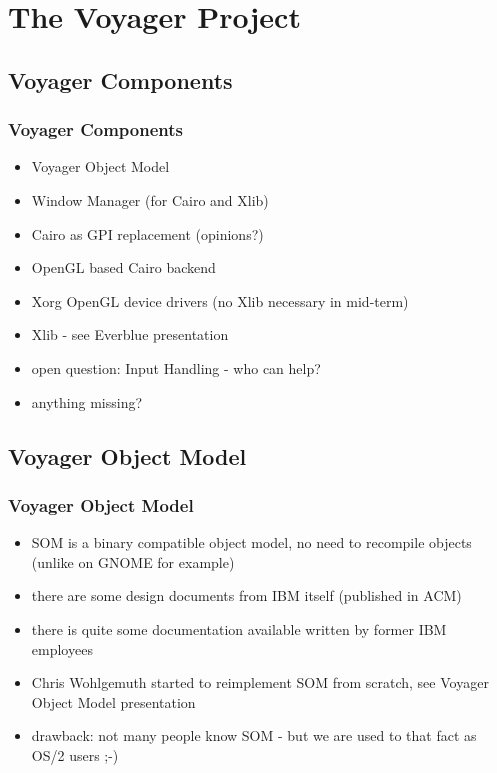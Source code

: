 \documentclass[handout]{beamer}
\begin{document}
\section{The Voyager Project}
\subsection{Voyager Components}
\begin{frame}
\frametitle{Voyager Components}
	\begin{itemize}
		\item Voyager Object Model
		\item Window Manager (for Cairo and Xlib)
		\item Cairo as GPI replacement (opinions?)
		\item OpenGL based Cairo backend
		\item Xorg OpenGL device drivers (no Xlib necessary in mid-term)
		\item Xlib - see Everblue presentation
		\item open question: Input Handling - who can help?
		\item anything missing? 
	\end{itemize}
\end{frame}

\subsection{Voyager Object Model}
\begin{frame}
\frametitle{Voyager Object Model}
	\begin{itemize}
		\item SOM is a binary compatible object model, no need to recompile objects (unlike on GNOME for example)
		\item there are some design documents from IBM itself (published in ACM)
		\item there is quite some documentation available written by former IBM employees
		\item Chris Wohlgemuth started to reimplement SOM from scratch, see Voyager Object Model presentation
		\item drawback: not many people know SOM - but we are used to that fact as OS/2 users ;-)
	\end{itemize}
\end{frame}
\end{document}
